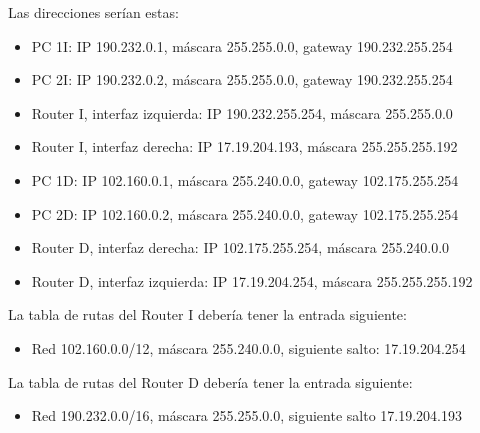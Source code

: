 \documentclass[letterpaper,10pt,spanish]{sphinxmanual}
\begin{document}
\sphinxAtStartPar
Las direcciones serían estas:
\begin{itemize}
\item {} 
\sphinxAtStartPar
PC 1I: IP 190.232.0.1, máscara 255.255.0.0, gateway 190.232.255.254

\item {} 
\sphinxAtStartPar
PC 2I: IP 190.232.0.2, máscara 255.255.0.0, gateway 190.232.255.254

\item {} 
\sphinxAtStartPar
Router I, interfaz izquierda: IP 190.232.255.254, máscara 255.255.0.0

\item {} 
\sphinxAtStartPar
Router I, interfaz derecha: IP 17.19.204.193, máscara 255.255.255.192

\item {} 
\sphinxAtStartPar
PC 1D: IP 102.160.0.1, máscara 255.240.0.0, gateway 102.175.255.254

\item {} 
\sphinxAtStartPar
PC 2D: IP 102.160.0.2, máscara 255.240.0.0, gateway 102.175.255.254

\item {} 
\sphinxAtStartPar
Router D, interfaz derecha: IP 102.175.255.254, máscara 255.240.0.0

\item {} 
\sphinxAtStartPar
Router D, interfaz izquierda: IP 17.19.204.254, máscara 255.255.255.192

\end{itemize}

\sphinxAtStartPar
La tabla de rutas del Router I debería tener la entrada siguiente:
\begin{itemize}
\item {} 
\sphinxAtStartPar
Red 102.160.0.0/12, máscara 255.240.0.0, siguiente salto: 17.19.204.254

\end{itemize}

\sphinxAtStartPar
La tabla de rutas del Router D debería tener la entrada siguiente:
\begin{itemize}
\item {} 
\sphinxAtStartPar
Red 190.232.0.0/16, máscara 255.255.0.0, siguiente salto 17.19.204.193

\end{itemize}
\end{document}
